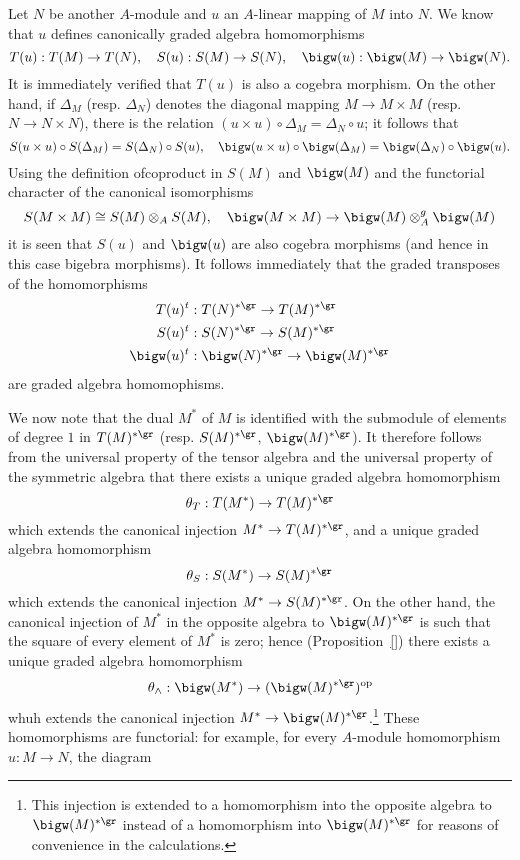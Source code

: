 Let $N$ be another $A$-module and $u$ an $A$-linear mapping of $M$ into $N$. We know that $u$ defines canonically graded algebra homomorphisms
\[T(u):T(M)\to T(N),\quad S(u):S(M)\to S(N),\quad \bigw(u):\bigw(M)\to\bigw(N).\]
It is immediately verified that $T(u)$ is also a cogebra morphism. On the other hand, if $\Delta_M$ (resp. $\Delta_N$) denotes the diagonal mapping $M\to M\times M$ (resp. $N\to N\times N$), there is the relation $(u\times u)\circ\Delta_M=\Delta_N\circ u$; it follows that
\[S(u\times u)\circ S(\Delta_M)=S(\Delta_N)\circ S(u),\quad \bigw(u\times u)\circ\bigw(\Delta_M)=\bigw(\Delta_N)\circ\bigw(u).\]
Using the definition ofcoproduct in $S(M)$ and $\bigw(M)$ and the functorial character of the canonical isomorphisms
\[S(M\times M)\cong S(M)\otimes_AS(M),\quad \bigw(M\times M)\to\bigw(M)\otimes_A^g\bigw(M)\]
it is seen that $S(u)$ and $\bigw(u)$ are also cogebra morphisms (and hence in this case bigebra morphisms). It follows immediately that the graded transposes  of the homomorphisms
\begin{equation}\label{cogebra homomorphism on dual of T,S,w}
\begin{aligned}
T(u)^t&:T(N)^{*\gr}\to T(M)^{*\gr}\\
S(u)^t&:S(N)^{*\gr}\to S(M)^{*\gr}\\
\bigw(u)^t&:\bigw(N)^{*\gr}\to\bigw(M)^{*\gr}
\end{aligned}
\end{equation}
are graded algebra homomophisms.\par
We now note that the dual $M^*$ of $M$ is identified with the submodule of elements of degree $1$ in $T(M)^{*\gr}$ (resp. $S(M)^{*\gr}$, $\bigw(M)^{*\gr}$). It therefore follows from the universal property of the tensor algebra and the universal property of the symmetric algebra that there exists a unique graded algebra homomorphism
\[\theta_T:T(M^*)\to T(M)^{*\gr}\]
which extends the canonical injection $M^*\to T(M)^{*\gr}$, and a unique graded algebra homomorphism
\[\theta_S:S(M^*)\to S(M)^{*\gr}\]
which extends the canonical injection $M^*\to S(M)^{*\gr}$. On the other hand, the canonical injection of $M^*$ in the opposite algebra to $\bigw(M)^{*\gr}$ is such that the square of every element of $M^*$ is zero; hence (Proposition~\ref{}) there exists a unique graded algebra homomorphism
\[\theta_{\wedge}:\bigw(M^*)\to(\bigw(M)^{*\gr})^{\text{op}}\]
whuh extends the canonical injection $M^*\to\bigw(M)^{*\gr}$.\footnote{This injection is extended to a homomorphism into the opposite algebra to $\bigw(M)^{*\gr}$ instead of a homomorphism into $\bigw(M)^{*\gr}$ for reasons of convenience in the calculations.} These homomorphisms are functorial: for example, for every $A$-module homomorphism $u:M\to N$, the diagram
